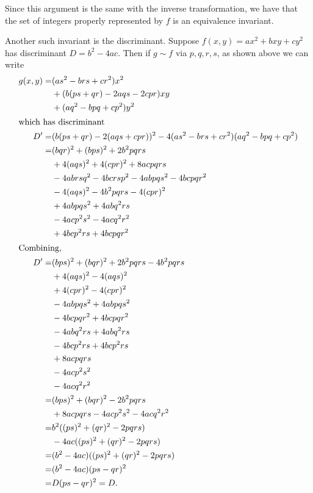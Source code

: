 Since this argument is the same with the inverse transformation, we have that the set of integers properly represented by $f$ is an equivalence invariant.

Another such invariant is the discriminant. Suppose $f(x,y)=ax^2+bxy+cy^2$ has discriminant $D = b^2-4ac$. Then if $g \sim f$ via $p,q,r,s$, as shown above we can write
\begin{align*}
g(x,y) =& (as^2-brs+cr^2)x^2\\
        & + (b(ps+qr)-2aqs-2cpr)xy\\
        & + (aq^2-bpq+cp^2)y^2\\
\intertext{which has discriminant}
D'= &(b(ps+qr)-2(aqs+cpr))^2 - 4(as^2-brs+cr^2)(aq^2-bpq+cp^2)\\
  = & (bqr)^2 + (bps)^2 + 2b^2pqrs\\
    & + 4(aqs)^2 + 4(cpr)^2 + 8acpqrs\\
    & - 4abrsq^2 - 4bcrsp^2 - 4abpqs^2 -4bcpqr^2\\
    & -4(aqs)^2 - 4b^2pqrs - 4(cpr)^2\\
    & + 4abpqs^2 + 4abq^2rs\\
    & - 4acp^2s^2 - 4acq^2r^2\\
    & + 4bcp^2rs + 4bcpqr^2\\
\intertext{Combining,}
D' = &(bps)^2 + (bqr)^2 + 2b^2pqrs - 4b^2pqrs\\
     & + 4(aqs)^2 - 4(aqs)^2\\
     & + 4(cpr)^2 - 4(cpr)^2\\
     & - 4abpqs^2 + 4abpqs^2\\
     & - 4bcpqr^2 + 4bcpqr^2\\
     & - 4abq^2rs + 4abq^2rs\\
     & - 4bcp^2rs + 4bcp^2rs\\
     & + 8acpqrs\\
     & - 4acp^2s^2\\
     & - 4acq^2r^2\\
   = &(bps)^2 + (bqr)^2 - 2b^2pqrs\\
     & + 8acpqrs - 4acp^2s^2 - 4acq^2r^2\\
   = &b^2((ps)^2 + (qr)^2 - 2pqrs)\\
     & - 4ac((ps)^2 + (qr)^2 - 2pqrs)\\
   = &(b^2 - 4ac)((ps)^2 + (qr)^2 - 2pqrs)\\
   = &(b^2 - 4ac)(ps - qr)^2\\
   = &D(ps - qr)^2 = D.\\
\end{align*}

